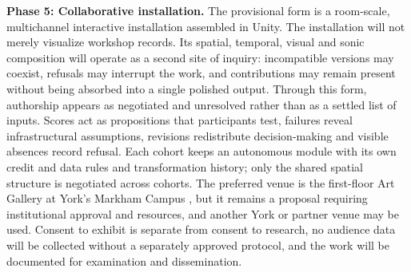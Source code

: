 \textbf{Phase 5: Collaborative installation.} The provisional form is a
room-scale, multichannel interactive installation assembled in Unity. The
installation will not merely visualize workshop records. Its spatial,
temporal, visual and sonic composition will operate as a second site of
inquiry: incompatible versions may coexist, refusals may interrupt the work,
and contributions may remain present without being absorbed into a single
polished output. Through this form, authorship appears as negotiated and
unresolved rather than as a settled list of inputs. Scores act as
propositions that participants test, failures reveal infrastructural
assumptions, revisions redistribute decision-making and visible absences
record refusal. Each cohort keeps an autonomous module with its own credit
and data rules and transformation history; only the shared spatial
structure is negotiated across cohorts. The preferred venue is the
first-floor Art Gallery at York's Markham Campus \citep{yorkmarkham2024}, but
it remains a proposal requiring institutional approval and resources, and
another York or partner venue may be used. Consent to exhibit is separate
from consent to research, no audience data will be collected without a
separately approved protocol, and the work will be documented for
examination and dissemination.
